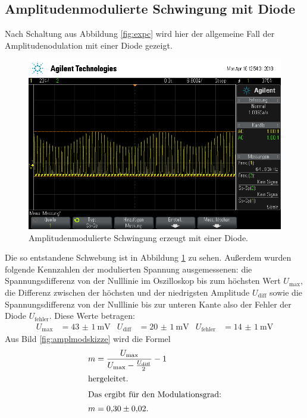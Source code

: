 \subsection{Amplitudenmodulierte Schwingung mit Diode}
\label{sec:amplModDiode}

Nach Schaltung aus Abbildung \ref{fig:expc} wird hier der allgemeine Fall der Amplitudenodulation mit einer Diode gezeigt.

\begin{figure}[h]
  \centering
  \includegraphics[width=.9\textwidth]{Oszi_Pics/amplModDiode.png}
  \caption{Amplitudenmodulierte Schwingung erzeugt mit einer Diode.}
  \label{fig:amplModDiode}
\end{figure}

Die so entstandene Schwebung ist in Abbildung \ref{fig:amplModDiode} zu sehen.
Außerdem wurden folgende Kennzahlen der modulierten Spannung ausgemessenen:
die Spannungsdifferenz von der Nulllinie im Oszilloskop bis zum höchsten Wert $U_\text{max}$, die Differenz zwischen der höchsten und der niedrigsten Amplitude $U_\text{diff}$ sowie die Spannungsdifferenz von der Nulllinie bis zur unteren Kante also der Fehler der Diode $U_\text{fehler}$.
Diese Werte betragen:
\begin{align*}
  U_\text{max} &= \SI{43(1)}{\milli\volt} & U_\text{diff} &= \SI{20(1)}{\milli\volt}  & U_\text{fehler} &= \SI{14(1)}{\milli\volt}
\end{align*}
Aus Bild \ref{fig:amplmodskizze} wird die Formel
\begin{align}
  m &= \frac{U_\text{max}}{U_\text{max} - \frac{U_\text{diff}}{2}} - 1\\
  \intertext{hergeleitet.}
  \intertext{Das ergibt für den Modulationsgrad:}
  m &= \num{0.30(2)}.
\end{align}

